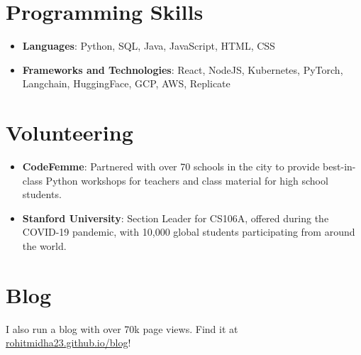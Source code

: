 \documentclass[letterpaper,11pt]{article}
\newcommand{\resumeItem}[2]{
  \item\small{
    \textbf{#1}{: #2 \vspace{-2pt}}
  }
}
\newcommand{\resumeSubHeadingListStart}{\begin{itemize}[leftmargin=*]}
\newcommand{\resumeSubHeadingListEnd}{\end{itemize}}
\begin{document}
\section{Programming Skills}
  \resumeSubHeadingListStart
   \item{
     \textbf{Languages}{: Python, SQL, Java, JavaScript, HTML, CSS}
      }
      \item{
       \textbf{Frameworks and Technologies}{: React, NodeJS, Kubernetes, PyTorch, Langchain, HuggingFace, GCP, AWS, Replicate}
    }
  \resumeSubHeadingListEnd

\section{Volunteering}
\resumeSubHeadingListStart
\resumeItem{CodeFemme}{Partnered with over 70 schools in the city to provide best-in-class Python workshops for teachers and class material for high school students.}
\resumeItem{Stanford University}{Section Leader for CS106A, offered during the COVID-19 pandemic, with 10,000 global students participating from around the world.}
\iffalse
\resumeItem{Google}{Organized the Google AI Explore ML Workshop at SSN College of Engineering.}
\fi
\resumeSubHeadingListEnd
\section{Blog}
I also run a blog with over 70k page views. Find it at \href{https://rohitmidha23.github.io/blog}{rohitmidha23.github.io/blog}!
\end{document}
